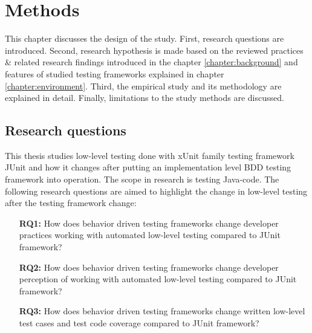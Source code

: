 \chapter{Methods}
\label{chapter:methods}
This chapter discusses the design of the study. First, research questions are introduced.
Second, research hypothesis is made based on the reviewed practices \& related research findings introduced in the chapter \ref{chapter:background}
and features of studied testing frameworks explained in chapter \ref{chapter:environment}.
Third, the empirical study and its methodology are explained in detail. Finally, limitations to the study methods are discussed.

\section{Research questions}
This thesis studies low-level testing done with xUnit family testing framework JUnit and how it changes after putting
an implementation level BDD testing framework into operation. The scope in research is testing Java-code. The following
research questions are aimed to highlight the change in low-level testing after the testing framework change:
\begin{addmargin}[2em]{0em}
\vspace{20px}
\begin{itemize}
\item[\textbf{RQ1:}] How does behavior driven testing frameworks change developer practices working with automated low-level testing compared to JUnit framework?
\item[\textbf{RQ2:}] How does behavior driven testing frameworks change developer perception of working with automated low-level testing compared to JUnit framework?
\item[\textbf{RQ3:}] How does behavior driven testing frameworks change written low-level test cases and test code coverage compared to JUnit framework?
\end{itemize}
\end{addmargin}

